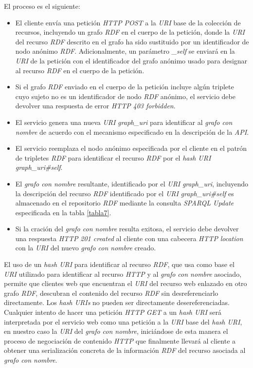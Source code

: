 El proceso es el siguiente:\\
\begin{itemize}

\item El cliente env\'ia una petici\'on \textit{HTTP} \textit{POST} a la \textit{URI} base de la colecci\'on de recursos, incluyendo un grafo \textit{RDF} en el cuerpo de la petici\'on, donde la \textit{URI} del recurso \textit{RDF} descrito en el grafo ha sido sustituido por un identificador de nodo an\'onimo \textit{RDF}. Adicionalmente, un par\'ametro \textit{\_self} se enviar\'a en la \textit{URI} de la petici\'on con el identificador del grafo an\'onimo usado para designar al recurso \textit{RDF} en el cuerpo de la petici\'on.
\item Si el grafo \textit{RDF} enviado en el cuerpo de la petici\'on incluye alg\'un triplete cuyo sujeto no es un identificador de nodo \textit{RDF} an\'onimo, el servicio debe devolver una respuesta de error \textit{HTTP} \textit{403 forbidden}.
\item El servicio genera una nueva \textit{URI} \textit{graph\_uri} para identificar al \textit{grafo con nombre} de acuerdo con el mecanismo especificado en la descripci\'on de la \textit{API}.
\item El servicio reemplaza el nodo an\'onimo especificada por el cliente en el patr\'on de tripletes \textit{RDF} para identificar el recurso \textit{RDF} por el \textit{hash URI} \cite{fielding2005httprange} \textit{graph\_uri\#self}.
\item El \textit{grafo con nombre} resultante, identificado por el \textit{URI} \textit{graph\_uri}, incluyendo la descripci\'on del recurso \textit{RDF} identificado por el \textit{URI} \textit{graph\_uri\#self} es almacenado en el repositorio \textit{RDF} mediante la consulta \textit{SPARQL Update} especificada en la tabla \ref{tabla7}.
\item Si la craci\'on del \textit{grafo con nombre}  resulta exitosa, el servicio debe devolver una respuesta \textit{HTTP} \textit{201 created} al cliente con una cabecera \textit{HTTP} \textit{location} con la \textit{URI} del nuevo \textit{grafo con nombre} creado.

\end{itemize}

El uso de un \textit{hash URI} para identificar al recurso \textit{RDF}, que usa como base el \textit{URI} utilizado para identificar al recurso \textit{HTTP} y al \textit{grafo con nombre} asociado, permite que clientes web que encuentran el \textit{URI} del recurso web enlazado en otro grafo \textit{RDF}, descubran el contenido del recurso \textit{RDF} sin desreferenciarlo directamente. Los \textit{hash URIs} no pueden ser directamente desereferenciadas. Cualquier intento de hacer una petici\'on \textit{HTTP} \textit{GET} a un \textit{hash URI} ser\'a interpretada por el servicio web como una petici\'on a la \textit{URI} base del \textit{hash URI}, en nuestro caso la \textit{URI} del \textit{grafo con nombre}, inici\'andose de esta manera el proceso de negociaci\'on de contenido \textit{HTTP} que finalmente llevar\'a al cliente a obtener una serializaci\'on concreta de la informaci\'on \textit{RDF} del recurso asociada al \textit{grafo con nombre}.

